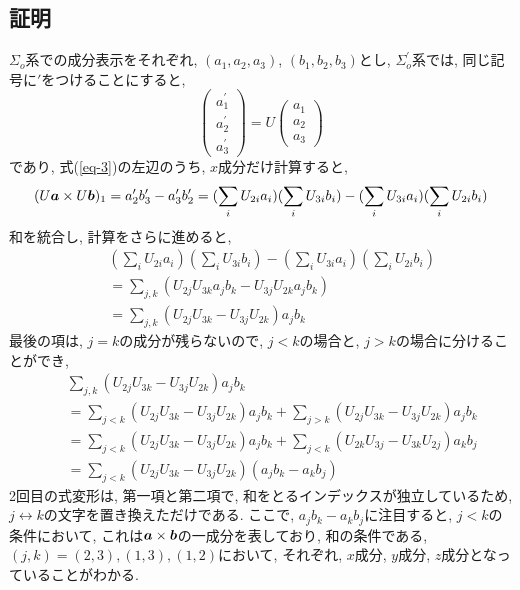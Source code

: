 \documentclass{jsarticle}
\newcommand*{\mbold}[1]{\mbox{\boldmath $#1$}}
\begin{document}
\subsection*{証明}
$\Sigma_o$系での成分表示をそれぞれ, $(a_1, a_2, a_3)$, $(b_1, b_2, b_3)$とし, $\Sigma_o^\prime$系では, 同じ記号に$\prime$をつけることにすると, 
\begin{equation}
  \begin{pmatrix}
    a_1^\prime \\
    a_2^\prime \\
    a_3^\prime
  \end{pmatrix}
  =
  U
  \begin{pmatrix}
    a_1 \\
    a_2 \\
    a_3
  \end{pmatrix}
\end{equation}
であり, 式(\ref{eq-3})の左辺のうち, $x$成分だけ計算すると, 
\begin{equation}
  (U\mbold{a} \times U\mbold{b})_1 = a_2^\prime b_3^\prime - a_3^\prime b_2^\prime
  = (\sum_i U_{2i}a_i)(\sum_i U_{3i}b_i) - (\sum_i U_{3i}a_i)(\sum_i U_{2i}b_i)
\end{equation}
和を統合し, 計算をさらに進めると, 
\begin{eqnarray}\label{eq-6}
  && (\sum_i U_{2i}a_i)(\sum_i U_{3i}b_i) - (\sum_i U_{3i}a_i)(\sum_i U_{2i}b_i) \nonumber \\
  && = \sum_{j, k}(U_{2j}U_{3k}a_j b_k - U_{3j}U_{2k}a_j b_k) \nonumber \\
  && = \sum_{j, k}(U_{2j}U_{3k} - U_{3j}U_{2k})a_j b_k
\end{eqnarray}
最後の項は, $j = k$の成分が残らないので, $j < k$の場合と, $j > k$の場合に分けることができ, 
\begin{eqnarray}\label{eq-7}
  && \sum_{j, k}(U_{2j}U_{3k} - U_{3j}U_{2k})a_j b_k \nonumber \\
  && = \sum_{j < k}(U_{2j}U_{3k} - U_{3j}U_{2k})a_j b_k + \sum_{j > k}(U_{2j}U_{3k} - U_{3j}U_{2k})a_j b_k \nonumber \\
  && = \sum_{j < k}(U_{2j}U_{3k} - U_{3j}U_{2k})a_j b_k + \sum_{j < k}(U_{2k}U_{3j} - U_{3k}U_{2j})a_k b_j \nonumber \\
  && = \sum_{j < k}(U_{2j}U_{3k} - U_{3j}U_{2k})(a_j b_k - a_k b_j)
\end{eqnarray}
2回目の式変形は, 第一項と第二項で, 和をとるインデックスが独立しているため, $j \leftrightarrow k$の文字を置き換えただけである. 
ここで, $a_j b_k - a_k b_j$に注目すると, $j < k$の条件において, これは$\mbold{a} \times \mbold{b}$の一成分を表しており, 
和の条件である, $(j, k) = (2, 3), (1, 3), (1, 2)$において, それぞれ, $x$成分, $y$成分, $z$成分となっていることがわかる.
\end{document}
